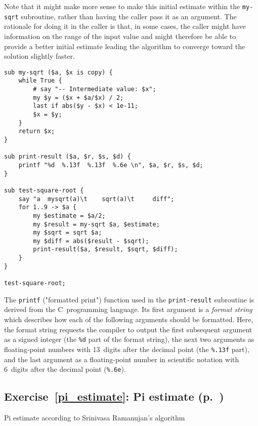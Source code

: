 Note that it might make more sense to make this 
initial estimate within the {\tt my-sqrt} subroutine, 
rather than having the caller pass it as an argument. The 
rationale for doing it in the caller is that, in some cases, 
the caller might have information on the range of the input 
value and might therefore be able to provide a better 
initial estimate leading the algorithm to converge toward 
the solution slightly faster.

\begin{verbatim}
sub my-sqrt ($a, $x is copy) {
    while True {
        # say "-- Intermediate value: $x";
        my $y = ($x + $a/$x) / 2;
        last if abs($y - $x) < 1e-11;
        $x = $y;
    }
    return $x;
}

sub print-result ($a, $r, $s, $d) {
    printf "%d  %.13f  %.13f  %.6e \n", $a, $r, $s, $d;
}

sub test-square-root {
    say "a  mysqrt(a)\t    sqrt(a)\t     diff";
    for 1..9 -> $a {
        my $estimate = $a/2;
        my $result = my-sqrt $a, $estimate;
        my $sqrt = sqrt $a;
        my $diff = abs($result - $sqrt);
        print-result($a, $result, $sqrt, $diff);
    }
}
    
test-square-root;
\end{verbatim}

The {\tt printf} ("formatted print") function used in 
the {\tt print-result} subroutine is derived from the 
C~programming language. Its first argument is a 
\emph{format string} which describes how each of 
the following arguments should be formatted. Here, the 
format string requests the compiler to output the 
first subsequent argument as a signed integer (the 
\verb'%d' part of the format string), the 
next two arguments as floating-point numbers with
13~digits after the decimal point (the \verb'%.13f' part), and 
the last argument as a floating-point number in scientific 
notation with 6~digits after the decimal point (\verb'%.6e').



\subsection{Exercise~\ref{pi_estimate}: Pi estimate (p.~\pageref{pi_estimate})}
\label{sol_pi_estimate}

Pi estimate according to Srinivasa Ramanujan's algorithm



